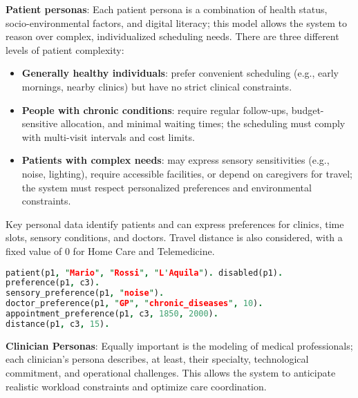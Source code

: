 \documentclass{tlp}
\begin{document}
\medskip
\noindent\textbf{Patient personas}: 
Each patient persona is a combination of health status, socio-environmental factors, and digital literacy; this model allows the system to reason over complex, individualized scheduling needs. There are three different levels of patient complexity:
\begin{itemize}
    \item \textbf{Generally healthy individuals}: prefer convenient scheduling (e.g., early mornings, nearby clinics) but have no strict clinical constraints. %
    \item \textbf{People with chronic conditions}: require regular follow-ups, budget-sensitive allocation, and minimal waiting times; the scheduling must comply with multi-visit intervals and cost limits. %
    \item \textbf{Patients with complex needs}: may express sensory sensitivities (e.g., noise, lighting), require accessible facilities, or depend on caregivers for travel; the system must respect personalized preferences and environmental constraints. %
 \end{itemize}   
 
Key personal data identify patients and can express preferences for clinics, time slots, sensory conditions, and doctors. Travel distance is also considered, with a fixed value of 0 for Home Care and Telemedicine.

\begin{lstlisting}[language=Prolog, caption=Patient Profile with Preferences and Constraints]
patient(p1, "Mario", "Rossi", "L'Aquila"). disabled(p1).
preference(p1, c3).
sensory_preference(p1, "noise").
doctor_preference(p1, "GP", "chronic_diseases", 10).
appointment_preference(p1, c3, 1850, 2000).
distance(p1, c3, 15).
\end{lstlisting}

\noindent
\textbf{Clinician Personas}: Equally important is the modeling of medical professionals; each clinician's persona describes, at least, their specialty, technological commitment, and operational challenges. This allows the system to anticipate realistic workload constraints and optimize care coordination. 
\end{document}
